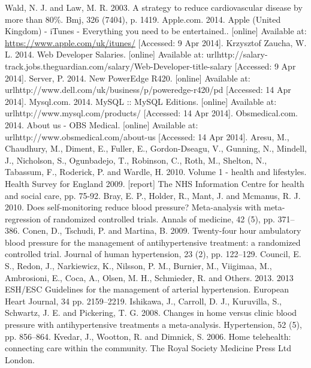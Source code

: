 \documentclass[11pt]{article}
\begin{document}
\begin{thebibliography}{40}
\begin{singlespace}
Wald, N. J. and Law, M. R. 2003. A strategy to reduce cardiovascular disease by more than 80\%. Bmj, 326 (7404), p. 1419.
Apple.com. 2014. Apple (United Kingdom) - iTunes - Everything you need to be entertained.. [online] Available at: \url{https://www.apple.com/uk/itunes/} [Accessed: 9 Apr 2014].
Krzysztof Zaucha, W. L. 2014. Web Developer Salaries. [online] Available at: url{http://salary-track.jobs.theguardian.com/salary/Web-Developer-title-salary} [Accessed: 9 Apr 2014].
Server, P. 2014. New PowerEdge R420. [online] Available at: url{http://www.dell.com/uk/business/p/poweredge-r420/pd} [Accessed: 14 Apr 2014].
Mysql.com. 2014. MySQL :: MySQL Editions. [online] Available at: url{http://www.mysql.com/products/} [Accessed: 14 Apr 2014].
Obsmedical.com. 2014. About us - OBS Medical. [online] Available at: url{http://www.obsmedical.com/about-us} [Accessed: 14 Apr 2014].
Aresu, M., Chaudhury, M., Diment, E., Fuller, E., Gordon-Dseagu, V., Gunning, N., Mindell, J., Nicholson, S., Ogunbadejo, T., Robinson, C., Roth, M., Shelton, N., Tabassum, F., Roderick, P. and Wardle, H. 2010. Volume 1 - health and lifestyles. Health Survey for England 2009. [report] The NHS Information Centre for health and social care, pp. 75-92.
Bray, E. P., Holder, R., Mant, J. and Mcmanus, R. J. 2010. Does self-monitoring reduce blood pressure? Meta-analysis with meta-regression of randomized controlled trials. Annals of medicine, 42 (5), pp. 371--386.
Conen, D., Tschudi, P. and Martina, B. 2009. Twenty-four hour ambulatory blood pressure for the management of antihypertensive treatment: a randomized controlled trial. Journal of human hypertension, 23 (2), pp. 122--129.
Council, E. S., Redon, J., Narkiewicz, K., Nilsson, P. M., Burnier, M., Viigimaa, M., Ambrosioni, E., Coca, A., Olsen, M. H., Schmieder, R. and Others. 2013. 2013 ESH/ESC Guidelines for the management of arterial hypertension. European Heart Journal, 34 pp. 2159--2219.
Ishikawa, J., Carroll, D. J., Kuruvilla, S., Schwartz, J. E. and Pickering, T. G. 2008. Changes in home versus clinic blood pressure with antihypertensive treatments a meta-analysis. Hypertension, 52 (5), pp. 856--864.
Kvedar, J., Wootton, R. and Dimnick, S. 2006. Home telehealth: connecting care within the community. The Royal Society Medicine Press Ltd London.

\end{singlespace}
\end{thebibliography}
\end{document}
